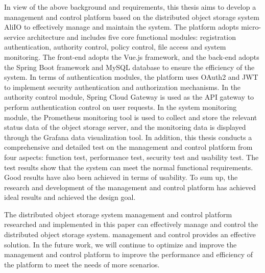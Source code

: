 \begin{abstract*}
  In view of the above background and requirements, this thesis aims to develop a management and control platform based on the distributed object 
  storage system AliIO to effectively manage and maintain the system. The platform adopts micro-service architecture and includes five core 
  functional modules: registration authentication, authority control, policy control, file access and system monitoring. The front-end adopts 
  the Vue.js framework, and the back-end adopts the Spring Boot framework and MySQL database to ensure the efficiency of the system. In terms 
  of authentication modules, the platform uses OAuth2 and JWT to implement security authentication and authorization mechanisms. In the authority 
  control module, Spring Cloud Gateway is used as the API gateway to perform authentication control on user requests. In the system monitoring 
  module, the Prometheus monitoring tool is used to collect and store the relevant status data of the object storage server, and the monitoring 
  data is displayed through the Grafana data visualization tool. In addition, this thesis conducts a comprehensive and detailed test on the 
  management and control platform from four aspects: function test, performance test, security test and usability test. The test results show that 
  the system can meet the normal functional requirements. Good results have also been achieved in terms of usability. To sum up, the research and 
  development of the management and control platform has achieved ideal results and achieved the design goal.

  The distributed object storage system management and control platform researched and implemented in this paper can effectively manage and 
  control the distributed object storage system. management and control provides an effective solution. In the future work, we will continue 
  to optimize and improve the management and control platform to improve the performance and efficiency of the platform to meet the needs of 
  more scenarios.
\end{abstract*}
